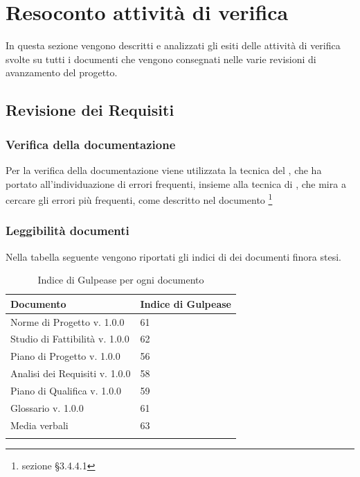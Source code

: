 \section{Resoconto attività di verifica}
In questa sezione vengono descritti e analizzati gli esiti delle attività di verifica svolte su tutti i documenti che vengono consegnati nelle varie revisioni di avanzamento del progetto.
	\subsection{Revisione dei Requisiti}
		\subsubsection{Verifica della documentazione}
		Per la verifica della documentazione viene utilizzata la tecnica del , che ha portato all'individuazione di errori frequenti, insieme alla tecnica di , che mira a cercare gli errori più frequenti, come descritto nel documento \footnote{sezione §3.4.4.1}
		\subsubsection{Leggibilità documenti}
		Nella tabella seguente vengono riportati gli indici di  dei documenti finora stesi.
		\begin{center}
			\begin{longtable}{|C{8cm}|C{4cm}|}
				\hline
				\textbf{Documento} & \textbf{Indice di Gulpease} \\ 			
				\hline
				\endhead
				
				\hline
				Norme di Progetto v. 1.0.0 & 61 \\
				\hline
				Studio di Fattibilità v. 1.0.0 & 62 \\
				\hline
				Piano di Progetto v. 1.0.0 & 56 \\
				\hline
				Analisi dei Requisiti v. 1.0.0 & 58 \\
				\hline
				Piano di Qualifica v. 1.0.0 & 59 \\
				\hline
				Glossario v. 1.0.0 & 61 \\
				\hline
				Media verbali & 63 \\
				\hline
				
				\hiderowcolors
				\caption{Indice di Gulpease per ogni documento}		
			\end{longtable}	
		\end{center}
